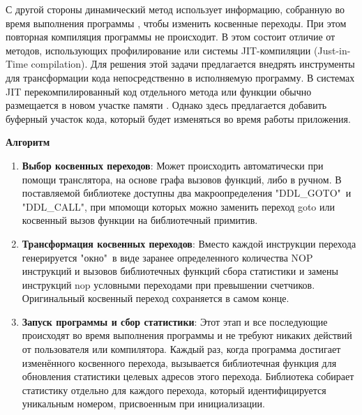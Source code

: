 С другой стороны динамический метод использует информацию, собранную во время выполнения программы \cite{baev2015profile,ishizaki2000study}, чтобы изменить косвенные переходы. При этом повторная компиляция программы не происходит. В этом состоит отличие от методов, использующих профилирование или системы JIT-компиляции (Just-in-Time compilation). 
Для решения этой задачи предлагается внедрять инструменты для трансформации кода непосредственно в исполняемую программу. В системах JIT перекомпилированный код отдельного метода или функции обычно размещается в новом участке памяти \cite{cravvford1988study}. Однако здесь предлагается добавить буферный участок кода, который будет изменяться во время работы приложения.
 

\textbf{Алгоритм}
 \begin{enumerate}
 	\item \textbf{Выбор косвенных переходов}: Может происходить автоматически при помощи транслятора, на основе графа вызовов функций, либо в ручном. В поставляемой библиотеке доступны два макроопределения "DDL\_GOTO"\  и "DDL\_CALL", при мпомощи которых можно заменить переход goto или косвенный вызов функции на библиотечный примитив. 
 	\item \textbf{Трансформация косвенных переходов}: Вместо каждой инструкции перехода генерируется "окно"\  в виде заранее определенного количества NOP инструкций и вызовов библиотечных функций сбора статистики и замены инструкций nop условными переходами при превышении счетчиков. Оригинальный косвенный переход сохраняется в самом конце.
 	\item \textbf{Запуск программы и сбор статистики}: Этот этап и все последующие происходят во время выполнения программы и не требуют никаких действий от пользователя или компилятора. Каждый раз, когда программа достигает изменённого косвенного перехода, вызывается библиотечная функция для обновления статистики целевых адресов этого перехода. Библиотека собирает статистику отдельно для каждого перехода, который идентифицируется уникальным номером, присвоенным при инициализации.
 	

\end{enumerate}
